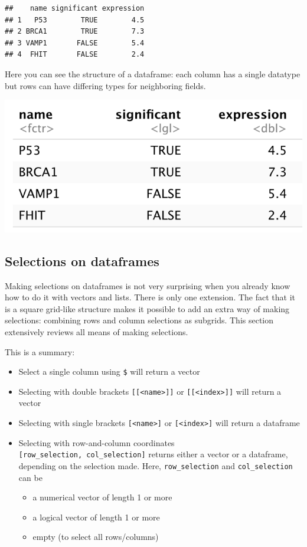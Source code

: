 \documentclass[]{book}
\providecommand{\tightlist}{%
  \setlength{\itemsep}{0pt}\setlength{\parskip}{0pt}}
\begin{document}
\begin{verbatim}
##    name significant expression
## 1   P53        TRUE        4.5
## 2 BRCA1        TRUE        7.3
## 3 VAMP1       FALSE        5.4
## 4  FHIT       FALSE        2.4
\end{verbatim}

Here you can see the structure of a dataframe: each column has a single datatype but rows can have differing types for neighboring fields.

\includegraphics{figures/Dataframe_view1.png}

\hypertarget{selections-on-dataframes}{%
\subsection{Selections on dataframes}\label{selections-on-dataframes}}

Making selections on dataframes is not very surprising when you already know how to do it with vectors and lists. There is only one extension. The fact that it is a square grid-like structure makes it possible to add an extra way of making selections: combining rows and column selections as subgrids. This section extensively reviews all means of making selections.

This is a summary:

\begin{itemize}
\tightlist
\item
  Select a single column using \texttt{\$} will return a vector
\item
  Selecting with double brackets \texttt{{[}{[}\textless{}name\textgreater{}{]}{]}} or \texttt{{[}{[}\textless{}index\textgreater{}{]}{]}} will return a vector
\item
  Selecting with single brackets \texttt{{[}\textless{}name\textgreater{}{]}} or \texttt{{[}\textless{}index\textgreater{}{]}} will return a dataframe
\item
  Selecting with row-and-column coordinates \texttt{{[}row\_selection,\ col\_selection{]}} returns either a vector or a dataframe, depending on the selection made. Here, \texttt{row\_selection} and \texttt{col\_selection} can be

  \begin{itemize}
  \tightlist
  \item
    a numerical vector of length 1 or more
  \item
    a logical vector of length 1 or more
  \item
    empty (to select all rows/columns)
  \end{itemize}
\end{itemize}
\end{document}
